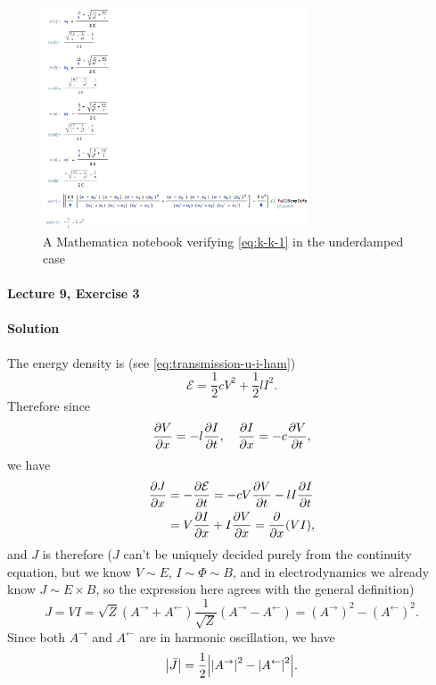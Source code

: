 \documentclass[hyperref, a4paper]{article}
\begin{document}
\begin{figure}
    \centering
    \includegraphics[width=0.7\textwidth]{software/kk-relation-1.PNG}
    \caption{A Mathematica notebook verifying \eqref{eq:k-k-1} in the underdamped case}
    \label{fig:notebook}
\end{figure}

\paragraph{Lecture 9, Exercise 3} 

\paragraph{Solution} The energy density is (see \eqref{eq:transmission-u-i-ham})
\begin{equation}
    \mathcal{E} = \frac{1}{2} c V^2 + \frac{1}{2} l I^2.
\end{equation}
Therefore since 
\begin{equation}
    \pdv{V}{x} = - l \pdv{I}{t}, \quad 
    \pdv{I}{x} = - c \pdv{V}{t},
\end{equation}
we have
\[
    \begin{aligned}
        \pdv{J}{x} &= - \pdv{\mathcal{E}}{t} = - c V \pdv{V}{t} - l I \pdv{I}{t} \\
        &= V \pdv{I}{x} + I \pdv{V}{x} = \pdv{x} (VI),
    \end{aligned}
\]
and $J$ is therefore 
($J$ can't be uniquely decided purely from the continuity equation,
but we know $V \sim E$, $I \sim \Phi \sim B$, 
and in electrodynamics we already know $J \sim E \times B$,
so the expression here agrees with the general definition)
\begin{equation}
    J = VI = \sqrt{Z} (A^{\rightarrow} + A^{\leftarrow}) \frac{1}{\sqrt{Z}} (A^{\rightarrow} - A^{\leftarrow})
    = (A^{\rightarrow})^2 - (A^{\leftarrow})^2.
\end{equation}
Since both $A^{\rightarrow}$ and $A^{\leftarrow}$ are in harmonic oscillation,
we have 
\begin{equation}
    \abs{\bar{J}} = \frac{1}{2} \abs{ \abs{A^{\rightarrow}}^2 - \abs{A^{\leftarrow}}^2 }.
\end{equation}
\end{document}
